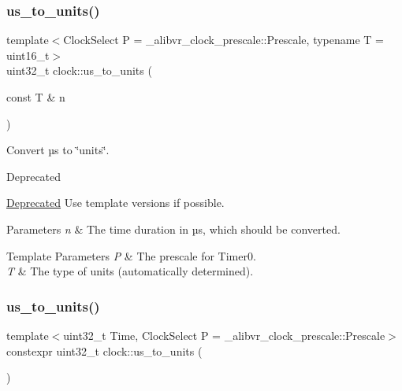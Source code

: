 \subsubsection{\texorpdfstring{us\+\_\+to\+\_\+units()}{us\_to\_units()}\hspace{0.1cm}{\footnotesize\ttfamily [1/2]}}
{\footnotesize\ttfamily template$<$Clock\+Select P = \+\_\+alibvr\+\_\+clock\+\_\+prescale\+::\+Prescale, typename T  = uint16\+\_\+t$>$ \\
uint32\+\_\+t clock\+::us\+\_\+to\+\_\+units (\begin{DoxyParamCaption}\item[{const T \&}]{n }\end{DoxyParamCaption})\hspace{0.3cm}{\ttfamily [inline]}}



Convert µs to \char`\"{}units\char`\"{}. 

\begin{DoxyRefDesc}{Deprecated}
\item[\hyperlink{deprecated__deprecated000004}{Deprecated}]Use template versions if possible.\end{DoxyRefDesc}



\begin{DoxyParams}{Parameters}
{\em n} & The time duration in µs, which should be converted. \\
\hline
\end{DoxyParams}

\begin{DoxyTemplParams}{Template Parameters}
{\em P} & The prescale for {\ttfamily Timer0}. \\
\hline
{\em T} & The type of units (automatically determined). \\
\hline
\end{DoxyTemplParams}
\hypertarget{namespaceclock_a058555acfdfbc406daf1cb9331b0bc6f}{}\label{namespaceclock_a058555acfdfbc406daf1cb9331b0bc6f} 
\subsubsection{\texorpdfstring{us\+\_\+to\+\_\+units()}{us\_to\_units()}\hspace{0.1cm}{\footnotesize\ttfamily [2/2]}}
{\footnotesize\ttfamily template$<$uint32\+\_\+t Time, Clock\+Select P = \+\_\+alibvr\+\_\+clock\+\_\+prescale\+::\+Prescale$>$ \\
constexpr uint32\+\_\+t clock\+::us\+\_\+to\+\_\+units (\begin{DoxyParamCaption}{ }\end{DoxyParamCaption})\hspace{0.3cm}{\ttfamily [inline]}}



